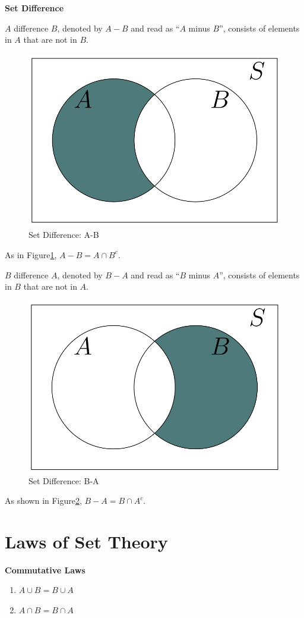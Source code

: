 \documentclass[
  12pt,
]{krantzNoCorner}
\providecommand{\tightlist}{%
  \setlength{\itemsep}{0pt}\setlength{\parskip}{0pt}}
\begin{document}
\textbf{Set Difference}

\(A\) difference \(B\), denoted by \(A-B\) and read as ``\(A\) minus \(B\)'',
consists of elements in \(A\) that are not in \(B\).

\begin{figure}
\includegraphics[width=0.5\linewidth,height=0.4\textheight]{Ven5} \caption{Set Difference: A-B}\label{fig:AminB}
\end{figure}

As in Figure\texttt{\ref{fig:AminB}}, \(A-B=A \cap B^c.\)

\(B\) difference \(A\), denoted by \(B-A\) and read as ``\(B\) minus \(A\)'',
consists of elements in \(B\) that are not in \(A\).

\begin{figure}
\includegraphics[width=0.5\linewidth,height=0.4\textheight]{Ven6} \caption{Set Difference: B-A}\label{fig:BminA}
\end{figure}

As shown in Figure\texttt{\ref{fig:BminA}}, \(B-A=B \cap A^c.\)

\hypertarget{laws-of-set-theory}{%
\section{Laws of Set Theory}\label{laws-of-set-theory}}

\textbf{Commutative Laws}

\begin{enumerate}
\def\labelenumi{\arabic{enumi}.}
\tightlist
\item
  \(A \cup B = B \cup A\)
\item
  \(A \cap B = B \cap A\)
\end{enumerate}
\end{document}
